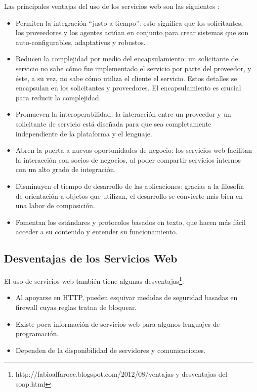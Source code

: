 	Las principales ventajas del uso de los servicios web son las siguientes \citep{doctorado2005}:
\begin{itemize}
	\item Permiten la integración “justo-a-tiempo”:  esto significa que los solicitantes, los proveedores y los agentes actúan en conjunto para crear sistemas que son auto-configurables, adaptativos y robustos.
	\item Reducen la complejidad por medio del encapsulamiento: un solicitante de servicio no sabe cómo fue implementado el servicio por parte del proveedor, y éste, a su vez, no sabe cómo utiliza el cliente el servicio. Estos detalles se encapsulan en los solicitantes y proveedores. El encapsulamiento es crucial para reducir la complejidad.
	\item Promueven la interoperabilidad: la interacción entre un proveedor y un solicitante de servicio está diseñada para que sea completamente independiente de la plataforma y el lenguaje. 
	\item Abren la puerta a nuevas oportunidades de negocio: los servicios web facilitan la interacción con socios de negocios, al poder compartir servicios internos con un alto grado de integración.
	\item Disminuyen el tiempo de desarrollo de las aplicaciones: gracias a la filosofía de orientación a objetos que utilizan, el desarrollo se convierte más bien en una labor de composición.
	\item Fomentan los estándares y protocolos basados en texto, que hacen más fácil acceder a su contenido y entender su funcionamiento.
\end{itemize}


\subsection{Desventajas de los  Servicios Web}
\label{cap:subsec:desventajasserviciosweb}
	El uso de servicios web también tiene algunas desventajas\footnote{http://fabioalfarocc.blogspot.com/2012/08/ventajas-y-desventajas-del-soap.html}:
\begin{itemize}
	\item Al apoyarse en HTTP, pueden esquivar medidas de seguridad basadas en firewall cuyas reglas tratan de bloquear.
	\item Existe poca información de servicios web para algunos lenguajes de programación.
	\item Dependen de la disponibilidad de servidores y comunicaciones.
\end{itemize}

